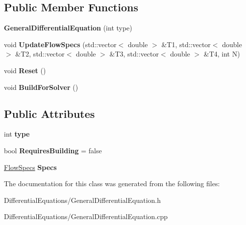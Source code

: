 \subsection*{Public Member Functions}
\begin{DoxyCompactItemize}
\item 
\mbox{\label{classGeneralDifferentialEquation_a4cbcdc8a02814d8a7fd4a0c3396f2cbd}} 
{\bfseries General\+Differential\+Equation} (int type)
\item 
\mbox{\label{classGeneralDifferentialEquation_a2822b2cb9303f156f235babd48fbf2a7}} 
void {\bfseries Update\+Flow\+Specs} (std\+::vector$<$ double $>$ \&T1, std\+::vector$<$ double $>$ \&T2, std\+::vector$<$ double $>$ \&T3, std\+::vector$<$ double $>$ \&T4, int N)
\item 
\mbox{\label{classGeneralDifferentialEquation_ad0cc54c8051369a2fa05ae9b1679c89c}} 
void {\bfseries Reset} ()
\item 
\mbox{\label{classGeneralDifferentialEquation_aaaeffd92dc367daa473dfb0a12e6c3e6}} 
void {\bfseries Build\+For\+Solver} ()
\end{DoxyCompactItemize}
\subsection*{Public Attributes}
\begin{DoxyCompactItemize}
\item 
\mbox{\label{classGeneralDifferentialEquation_a5e74b72eaad71cfaef6cd67881cb0033}} 
int {\bfseries type}
\item 
\mbox{\label{classGeneralDifferentialEquation_a4af7ed36584cc27ba75848aaf7383fe3}} 
bool {\bfseries Requires\+Building} = false
\item 
\mbox{\label{classGeneralDifferentialEquation_aea4ad56284abaa02afde25027e35116d}} 
\hyperlink{structFlowSpecs}{Flow\+Specs} {\bfseries Specs}
\end{DoxyCompactItemize}


The documentation for this class was generated from the following files\+:\begin{DoxyCompactItemize}
\item 
Differential\+Equations/General\+Differential\+Equation.\+h\item 
Differential\+Equations/General\+Differential\+Equation.\+cpp\end{DoxyCompactItemize}

